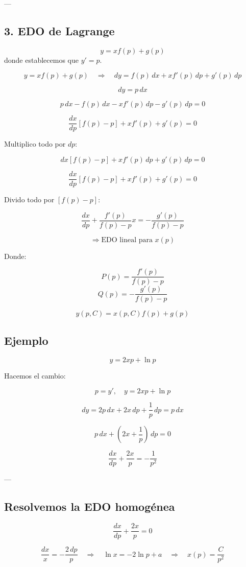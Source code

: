 \documentclass[a4paper,12pt]{article}
\begin{document}
---

\subsection*{3. EDO de Lagrange}

\[
y = x f(p) + g(p)
\]
donde establecemos que \(y' = p\).

\[
y = x f(p) + g(p) \quad \Rightarrow \quad dy = f(p)\, dx + x f'(p)\, dp + g'(p)\, dp
\]

\[
dy = p\, dx
\]

\[
p\, dx - f(p)\, dx - x f'(p)\, dp - g'(p)\, dp = 0
\]

\[
\frac{dx}{dp} [f(p) - p] + x f'(p) + g'(p) = 0
\]

Multiplico todo por \(dp\):

\[
dx [f(p) - p] + x f'(p)\, dp + g'(p)\, dp = 0
\]

\[
\frac{dx}{dp} [f(p) - p] + x f'(p) + g'(p) = 0
\]

Divido todo por \([f(p) - p]\):

\[
\frac{dx}{dp} + \frac{f'(p)}{f(p) - p} x = - \frac{g'(p)}{f(p) - p}
\]

\[
\Rightarrow \text{EDO lineal para } x(p)
\]

Donde:

\[
P(p) = \frac{f'(p)}{f(p) - p}
\]
\[
Q(p) = -\frac{g'(p)}{f(p) - p}
\]

\[
y(p, C) = x(p, C) f(p) + g(p)
\]
\subsection*{Ejemplo}

\[
y = 2xp + \ln p
\]

Hacemos el cambio:

\[
p = y', \quad y = 2xp + \ln p
\]

\[
dy = 2p\, dx + 2x\, dp + \frac{1}{p}\, dp = p\, dx
\]

\[
p\, dx + (2x + \frac{1}{p})\, dp = 0
\]

\[
\frac{dx}{dp} + \frac{2x}{p} = -\frac{1}{p^2}
\]

---

\subsection*{Resolvemos la EDO homogénea}

\[
\frac{dx}{dp} + \frac{2x}{p} = 0
\]

\[
\frac{dx}{x} = -\frac{2\, dp}{p} 
\quad \Rightarrow \quad 
\ln x = -2 \ln p + a 
\quad \Rightarrow \quad 
x(p) = \frac{C}{p^2}
\]
\end{document}
